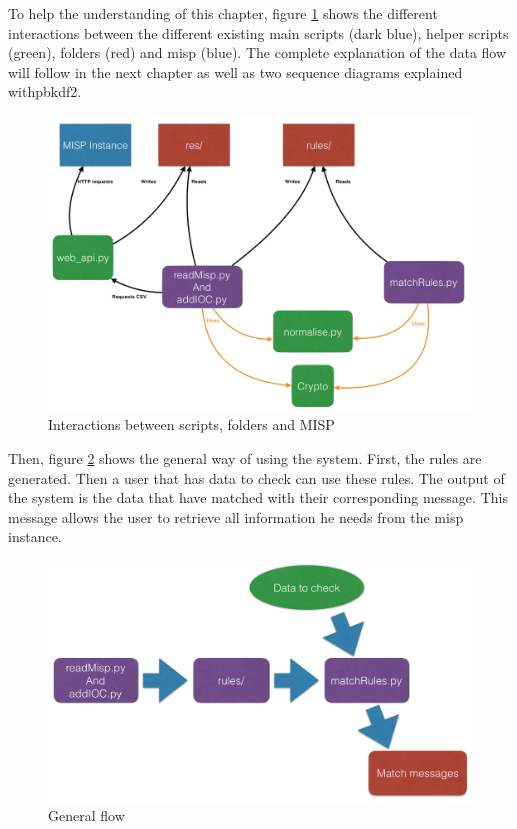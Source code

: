 \documentclass{eplmastersthesis}
\begin{document}
To help the understanding of this chapter, figure \ref{interactions} shows the different interactions between the different existing main scripts (dark blue), helper scripts (green), folders (red) and \gls{misp} (blue). The complete explanation of the data flow will follow in the next chapter as well as two sequence diagrams explained with\gls{pbkdf2}. 

\begin{figure}
\centering
\includegraphics[scale=0.4]{res/interactions}
\caption{Interactions between scripts, folders and MISP}
\label{interactions}
\end{figure}

Then, figure \ref{general-flow} shows the general way of using the system. First, the rules are generated. Then a user that has data to check can use these rules. The output of the system is the data that have matched with their corresponding message. This message allows the user to retrieve all information he needs from the \gls{misp} instance.\\

\begin{figure}
\centering
\includegraphics[scale=0.4]{res/generalFlow}
\caption{General flow}
\label{general-flow}
\end{figure}
\end{document}
